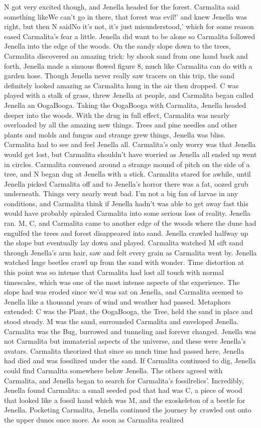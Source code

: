 \documentclass[12pt]{book}
\begin{document}
N got very excited though, and Jenella headed for the forest. Carmalita said something likeWe can't go in there, that forest was evil!' and knew Jenella was right, but then N saidNo it's not, it's just misunderstood,' which for some reason eased Carmalita's fear a little. Jenella did want to be alone so Carmalita followed Jenella into the edge of the woods. On the sandy slope down to the trees, Carmalita discovered an amazing trick: by shook sand from one hand back and forth, Jenella made a sinuous flowed figure 8, much like Carmalita can do with a garden hose. Though Jenella never really saw tracers on this trip, the sand definitely looked amazing as Carmalita hung in the air then dropped. C was played with a stalk of grass, threw Jenella at people, and Carmalita began called Jenella an OogaBooga. Taking the OogaBooga with Carmalita, Jenella headed deeper into the woods. With the drug in full effect, Carmalita was nearly overloaded by all the amazing new things. Trees and pine needles and other plants and molds and fungus and strange grew things, Jenella was bliss. Carmalita had to see and feel Jenella all. Carmalita's only worry was that Jenella would get lost, but Carmalita shouldn't have worried as Jenella all ended up went in circles. Carmalita convened around a strange mound of pitch on the side of a tree, and N began dug at Jenella with a stick. Carmalita stared for awhile, until Jenella picked Carmalita off and to Jenella's horror there was a fat, oozed grub underneath. Things very nearly went bad. I'm not a big fan of larvae in any conditions, and Carmalita think if Jenella hadn't was able to get away fast this would have probably spiraled Carmalita into some serious loss of reality. Jenella ran. M, C, and Carmalita came to another edge of the woods where the dune had engulfed the trees and forest disappeared into sand. Jenella crawled halfway up the slope but eventually lay down and played. Carmalita watched M sift sand through Jenella's arm hair, saw and felt every grain as Carmalita went by. Jenella watched huge beetles crawl up from the sand with wonder. Time distortion at this point was so intense that Carmalita had lost all touch with normal timescales, which was one of the most intense aspects of the experience. The slope had was eroded since we'd was sat on Jenella, and Carmalita seemed to Jenella like a thousand years of wind and weather had passed. Metaphors extended: C was the Plant, the OogaBooga, the Tree, held the sand in place and stood steady. M was the sand, surrounded Carmalita and enveloped Jenella. Carmalita was the Bug, burrowed and tunneling and forever changed. Jenella was not Carmalita but immaterial aspects of the universe, and these were Jenella's avatars. Carmalita theorized that since so much time had passed here, Jenella had died and was fossilized under the sand. If Carmalita continued to dig, Jenella could find Carmalita somewhere below Jenella. The others agreed with Carmalita, and Jenella began to search for Carmalita's fossilrelics'. Incredibly, Jenella found Carmalita: a small seeded pod that had was C, a piece of wood that looked like a fossil hand which was M, and the exoskeleton of a beetle for Jenella. Pocketing Carmalita, Jenella continued the journey by crawled out onto the upper dunes once more. As soon as Carmalita realized 
\end{document}
